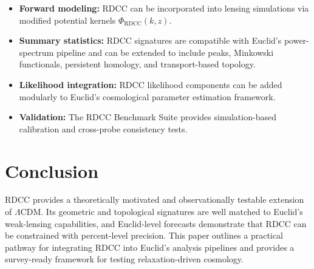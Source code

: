 \documentclass[11pt,a4paper]{article}
\begin{document}
\begin{itemize}
    \item \textbf{Forward modeling:}  
    RDCC can be incorporated into lensing simulations via modified potential
    kernels $\Phi_{\mathrm{RDCC}}(k,z)$.

    \item \textbf{Summary statistics:}  
    RDCC signatures are compatible with Euclid's power-spectrum pipeline and can
    be extended to include peaks, Minkowski functionals, persistent homology,
    and transport-based topology.

    \item \textbf{Likelihood integration:}  
    RDCC likelihood components can be added modularly to Euclid's cosmological
    parameter estimation framework.

    \item \textbf{Validation:}  
    The RDCC Benchmark Suite provides simulation-based calibration and
    cross-probe consistency tests.
\end{itemize}


\section{Conclusion}

RDCC provides a theoretically motivated and observationally testable extension of
$\Lambda$CDM. Its geometric and topological signatures are well matched to
Euclid's weak-lensing capabilities, and Euclid-level forecasts demonstrate that
RDCC can be constrained with percent-level precision. This paper outlines a
practical pathway for integrating RDCC into Euclid's analysis pipelines and
provides a survey-ready framework for testing relaxation-driven cosmology.
\end{document}
